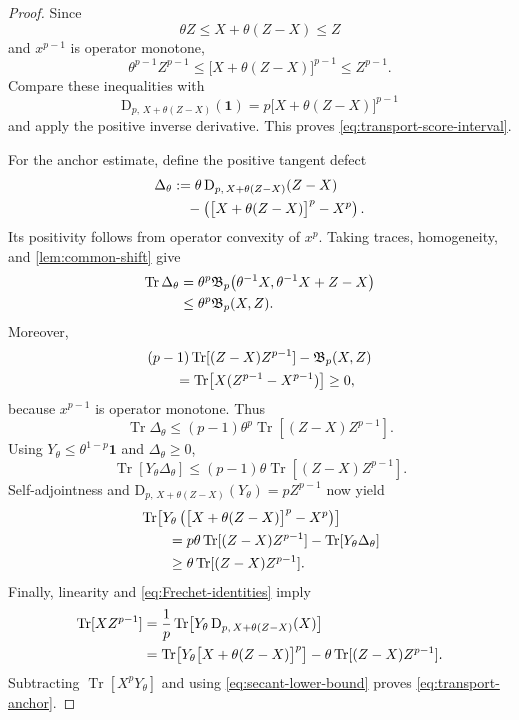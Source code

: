 \documentclass[11pt,reqno]{amsart}
\theoremstyle{definition}
\DeclareMathOperator{\Tr}{Tr}
\newcommand{\I}{\mathbf 1}
\newcommand{\Breg}{\mathfrak{B}}
\begin{document}
\begin{proof}
Since
\[
 \theta Z\leq X+\theta(Z-X)\leq Z
\]
and $x^{p-1}$ is operator monotone,
\[
 \theta^{p-1}Z^{p-1}
 \leq
 \bigl[X+\theta(Z-X)\bigr]^{p-1}
 \leq
 Z^{p-1}.
\]
Compare these inequalities with
\[
 \mathrm D_{p,\,X+\theta(Z-X)}(\I)
 =p\bigl[X+\theta(Z-X)\bigr]^{p-1}
\]
and apply the positive inverse derivative.  This proves
\cref{eq:transport-score-interval}.

For the anchor estimate, define the positive tangent defect
\begin{align}
 \Delta_\theta
 &:={}
 \theta\,\mathrm D_{p,\,X+\theta(Z-X)}(Z-X)\notag\\
 &\quad-
 \left(\bigl[X+\theta(Z-X)\bigr]^p-X^p\right).
 \label{eq:tangent-defect}
\end{align}
Its positivity follows from operator convexity of $x^p$.  Taking traces,
homogeneity, and \cref{lem:common-shift} give
\begin{align}
 \Tr\Delta_\theta
 &=\theta^p
 \Breg_p\!\left(\theta^{-1}X,
 \theta^{-1}X+Z-X\right)\notag\\
 &\leq\theta^p\Breg_p(X,Z).
 \label{eq:defect-common-shift}
\end{align}
Moreover,
\begin{align}
 &(p-1)\Tr[(Z-X)Z^{p-1}]-\Breg_p(X,Z)\notag\\
 &\qquad=\Tr\!\left[X(Z^{p-1}-X^{p-1})\right]\geq0,
 \label{eq:Bregman-budget}
\end{align}
because $x^{p-1}$ is operator monotone.  Thus
\begin{equation}\label{eq:defect-trace-bound}
 \Tr\Delta_\theta
 \leq(p-1)\theta^p\Tr[(Z-X)Z^{p-1}].
\end{equation}
Using $Y_\theta\leq\theta^{1-p}\I$ and
$\Delta_\theta\geq0$,
\begin{equation}\label{eq:transported-defect-bound}
 \Tr[Y_\theta\Delta_\theta]
 \leq(p-1)\theta\Tr[(Z-X)Z^{p-1}].
\end{equation}
Self-adjointness and
$\mathrm D_{p,\,X+\theta(Z-X)}(Y_\theta)=pZ^{p-1}$ now yield
\begin{align}
 &\Tr\!\left[Y_\theta
 \left(\bigl[X+\theta(Z-X)\bigr]^p-X^p\right)\right]\notag\\
 &\qquad=
 p\theta\Tr[(Z-X)Z^{p-1}]
 -\Tr[Y_\theta\Delta_\theta]\notag\\
 &\qquad\geq
 \theta\Tr[(Z-X)Z^{p-1}].
 \label{eq:secant-lower-bound}
\end{align}
Finally, linearity and \cref{eq:Frechet-identities} imply
\begin{align}
 \Tr[XZ^{p-1}]
 &=\frac1p\Tr\!\left[
 Y_\theta\,\mathrm D_{p,\,X+\theta(Z-X)}(X)
 \right]\notag\\
 &=\Tr\!\left[Y_\theta
 \bigl[X+\theta(Z-X)\bigr]^p\right]
 -\theta\Tr[(Z-X)Z^{p-1}].
 \label{eq:anchor-rewrite}
\end{align}
Subtracting $\Tr[X^pY_\theta]$ and using
\cref{eq:secant-lower-bound} proves \cref{eq:transport-anchor}.
\end{proof}
\end{document}
